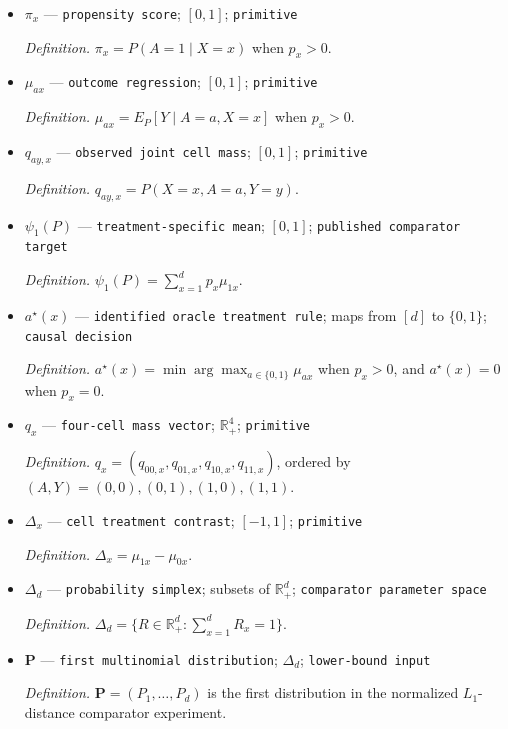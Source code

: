 \documentclass{article}
\begin{document}
\begin{itemize}
  \par\smallskip\noindent\emph{Definition.} \(p_x=P(X=x)\).
  \item \(\pi_x\) --- \texttt{propensity score}; \([0,1]\); \texttt{primitive}
  \par\smallskip\noindent\emph{Definition.} \(\pi_x=P(A=1\mid X=x)\) when \(p_x>0\).
  \item \(\mu_{ax}\) --- \texttt{outcome regression}; \([0,1]\); \texttt{primitive}
  \par\smallskip\noindent\emph{Definition.} \(\mu_{ax}=E_P[Y\mid A=a,X=x]\) when \(p_x>0\).
  \item \(q_{ay,x}\) --- \texttt{observed joint cell mass}; \([0,1]\); \texttt{primitive}
  \par\smallskip\noindent\emph{Definition.} \(q_{ay,x}=P(X=x,A=a,Y=y)\).
  \item \(\psi_1(P)\) --- \texttt{treatment-\allowbreak{}specific mean}; \([0,1]\); \texttt{published comparator target}
  \par\smallskip\noindent\emph{Definition.} \(\psi_1(P)=\sum_{x=1}^dp_x\mu_{1x}\).
  \item \(a^\star(x)\) --- \texttt{identified oracle treatment rule}; maps from \([d]\) to \(\{0,1\}\); \texttt{causal decision}
  \par\smallskip\noindent\emph{Definition.} \(a^\star(x)=\min\arg\max_{a\in\{0,1\}}\mu_{ax}\) when \(p_x>0\), and \(a^\star(x)=0\) when \(p_x=0\).
  \item \(q_x\) --- \texttt{four-\allowbreak{}cell mass vector}; \(\mathbb R_+^4\); \texttt{primitive}
  \par\smallskip\noindent\emph{Definition.} \(q_x=(q_{00,x},q_{01,x},q_{10,x},q_{11,x})\), ordered by \((A,Y)=(0,0),(0,1),(1,0),(1,1)\).
  \item \(\Delta_x\) --- \texttt{cell treatment contrast}; \([-1,1]\); \texttt{primitive}
  \par\smallskip\noindent\emph{Definition.} \(\Delta_x=\mu_{1x}-\mu_{0x}\).
  \item \(\Delta_d\) --- \texttt{probability simplex}; subsets of \(\mathbb R_+^d\); \texttt{comparator parameter space}
  \par\smallskip\noindent\emph{Definition.} \(\Delta_d=\{R\in\mathbb R_+^d:\sum_{x=1}^dR_x=1\}\).
  \item \(\mathbf P\) --- \texttt{first multinomial distribution}; \(\Delta_d\); \texttt{lower-\allowbreak{}bound input}
  \par\smallskip\noindent\emph{Definition.} \(\mathbf P=(P_1,\ldots,P_d)\) is the first distribution in the normalized \(L_1\)-distance comparator experiment.

\end{itemize}
\end{document}
